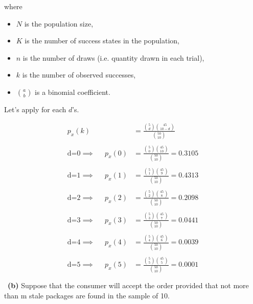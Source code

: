 \documentclass[a4 paper]{article}
\numberwithin{equation}{section}
\newcommand{\subproblem}[1]{~\newline\textbf{(#1)}}
\newcommand{\0}{\mathbf{0}}
\begin{document}
where
\begin{itemize}
\item $N$ is the population size,
\item $K$ is the number of success states in the population,
\item $n$ is the number of draws (i.e. quantity drawn in each trial),
\item $k$ is the number of observed successes,
\item $\binom{a}{b}$ is a binomial coefficient.
\end{itemize}

Let's apply for each $d$'s.

\begin{align*}
     p_x(k) &= \frac{\binom{5}{d}\binom{45}{10-d}}{\binom{50}{10}}  \\ \\
      \text{d=0} \implies \;\;\;\;\;  p_x(0) &= \frac{\binom{5}{0}\binom{45}{10}}{\binom{50}{10}} =0.3105\\ \\ 
    \text{d=1} \implies \;\;\;\;\; p_x(1) &= \frac{\binom{5}{1}\binom{45}{9}}{\binom{50}{10}}= 0.4313\\\\ 
    \text{d=2} \implies\;\;\;\;\; p_x(2) &= \frac{\binom{5}{2}\binom{45}{8}}{\binom{50}{10}}= 0.2098\\\\ 
    \text{d=3} \implies\;\;\;\;\; p_x(3) &= \frac{\binom{5}{3}\binom{45}{7}}{\binom{50}{10}}=0.0441 \\\\ 
    \text{d=4} \implies\;\;\;\;\; p_x(4) &= \frac{\binom{5}{4}\binom{45}{6}}{\binom{50}{10}}=0.0039  \\\\ 
    \text{d=5}\implies \;\;\;\;\; p_x(5) &= \frac{\binom{5}{5}\binom{45}{5}}{\binom{50}{10}}= 0.0001 \\\\ 
\end{align*}
\newline
\newline
\subproblem{b} Suppose that the consumer will accept the order provided that not more than m stale packages are found in the sample of 10.
\end{document}
